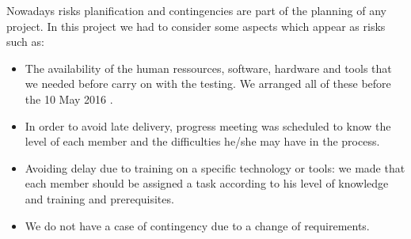 Nowadays risks planification and contingencies are part of the planning of any project. In this project we had to consider some aspects which appear as risks such as: 

\begin{itemize}
 
     \item  The availability of the human ressources, software, hardware and tools that we needed before carry on with the testing. We arranged all of these before the 10 May 2016 . 

      \item In order to avoid late delivery, progress meeting was scheduled to know the level of each member and the difficulties he/she may have in the process.

      \item Avoiding delay due to training on a specific technology or tools: we made that each member should be assigned a task according to his level of knowledge and training and prerequisites.     

       \item We do not have a case of contingency due to a change of requirements. 

\end{itemize}                        